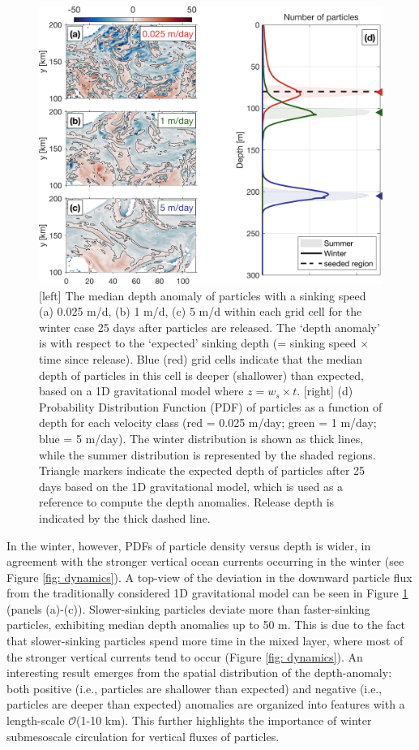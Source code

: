 \documentclass[article,linenumbers]{agujournal2019}
\begin{document}
	\begin{figure}[ht!]
		\centering
		\includegraphics[width = .8\linewidth]{Fig6.png}
		\caption{[left]
			The median depth anomaly of particles with a sinking speed (a) 0.025 m/d, (b) 1 m/d, (c) 5 m/d within each grid cell for the winter case 25 days after particles are released. The `depth anomaly' is with respect to the `expected' sinking depth (= sinking speed $\times$ time since release). Blue (red) grid cells indicate that the median depth of particles in this cell is deeper (shallower) than expected, based on a 1D gravitational model where $z = w_s\times t$. [right] (d) Probability Distribution Function (PDF) of particles as a function of depth for each velocity class (red = 0.025 m/day; green = 1 m/day; blue = 5 m/day). The winter distribution is shown as thick lines, while the summer distribution is represented by the shaded regions. Triangle markers indicate the expected depth of particles after 25 days based on the 1D gravitational model, which is used as a reference to compute the depth anomalies. Release depth is indicated by the thick dashed line.}
		\label{fig: particle_depth_distribution}
	\end{figure}

	In the winter, however, PDFs of particle density versus depth is wider, in agreement with the stronger vertical ocean currents occurring in the winter (see Figure \ref{fig: dynamics}). A top-view of the deviation in the downward particle flux from the traditionally considered 1D gravitational model can be seen in Figure \ref{fig: particle_depth_distribution} (panels (a)-(c)). Slower-sinking particles deviate more than faster-sinking particles, exhibiting median depth anomalies up to 50 m. This is due to the fact that slower-sinking particles spend more time in the mixed layer, where most of the stronger vertical currents tend to occur (Figure \ref{fig: dynamics}). An interesting result emerges from the spatial distribution of the depth-anomaly: both positive (i.e., particles are shallower than expected) and negative (i.e., particles are deeper than expected) anomalies are organized into features with a length-scale $\mathcal{O}$(1-10 km). This further highlights the importance of winter submesoscale circulation for vertical fluxes of particles.
\end{document}
